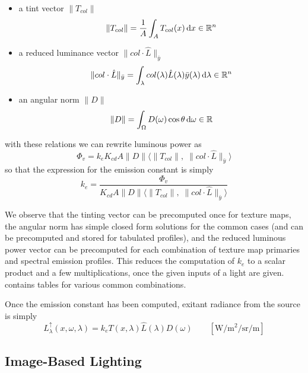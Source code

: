 \begin{itemize}
\item a tint vector $\|T_{col}\|$
\begin{equation}
\|T_{col}\|  = \frac1A\int_A T_{col}(x) \mathop{}\!\mathrm{d} x \in \mathbb{R}^n
\end{equation}
\item a reduced luminance vector $\|col \cdot \hat{L}\|_{\bar y}$
\begin{equation}
\|col \cdot \hat{L}\|_{\bar y} = \int_\lambda col(\lambda) \hat{L}(\lambda)
\bar{y}(\lambda) \mathop{}\!\mathrm{d}\lambda \in \mathbb{R}^n
\end{equation}
\item an angular norm $\|D\|$
\begin{equation}
 \|D\| = \int_\Omega D(\omega) \cos\theta \mathop{}\!\mathrm{d}\omega \in \mathbb{R}
\end{equation}
\end{itemize}
with these relations we can rewrite luminous power as
\begin{equation}
\Phi_v = k_e K_{cd} A \|D\| \big\langle \|T_{col}\|,\; \|col\cdot \hat{L}\|_{\bar
y} \big\rangle
\end{equation}
so that the expression for the emission constant is simply
\begin{equation}
 k_e = \frac{\Phi_v}{K_{cd} A \|D\| \big\langle \|T_{col}\|,\; \|col\cdot \hat{L}\|_{\bar y} \big\rangle }
\end{equation}

We observe that the tinting vector can be precomputed once for texture maps, the
angular norm has simple closed form solutions for the common cases (and can be
precomputed and stored for tabulated profiles), and the reduced luminous power
vector can be precomputed for each combination of texture map primaries and
spectral emission profiles.
This reduces the computation of $k_e$ to a scalar product and a few
multiplications, once the given inputs of a light are given.
 contains tables for various common combinations.

Once the emission constant has been computed, exitant radiance from the source
is simply
\begin{equation}
L^\uparrow_{\lambda}(x, \omega, \lambda) = k_e T(x, \lambda) \hat{L}(\lambda)
D(\omega)
\qquad \left[\unit{\watt\per\square\meter\per\steradian\per\meter}\right]
\end{equation}


\subsection{Image-Based Lighting}

